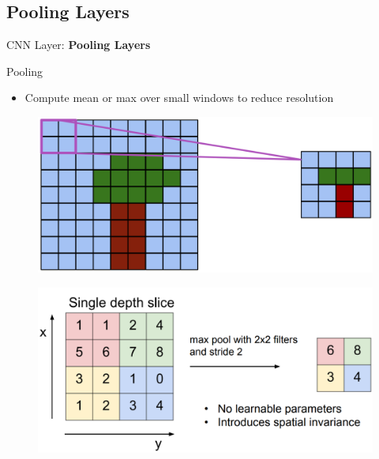 \subsection{Pooling Layers}
\begin{frame}{}
    \LARGE CNN Layer: \textbf{Pooling Layers}
\end{frame}

\begin{frame}[allowframebreaks]{Pooling}

\begin{itemize}
    \item Compute mean or max over small windows to reduce resolution
\end{itemize}


\begin{figure}
\centering
\includegraphics[width=1.0\textwidth,height=0.8\textheight,keepaspectratio]{images/cnn/pool_1.png}
\end{figure}

\framebreak

\begin{figure}
\centering
\includegraphics[width=1.0\textwidth,height=0.8\textheight,keepaspectratio]{images/cnn/pool_2.png}
\end{figure}
    
\end{frame}

